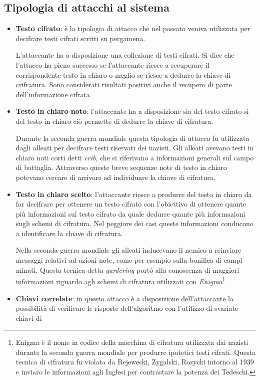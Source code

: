 \documentclass[11pt, a4paper, oneside]{Thesis} %
\begin{document}
\subsection{Tipologia di attacchi al sistema}
\begin{itemize}
 \item \textbf{Testo cifrato}: è la tipologia di attacco che nel passato veniva utilizzata per decifrare testi cifrati scritti su pergamena. 
 \par L'attaccante ha a disposizione una collezione di testi cifrati. Si dice che l'attacco ha pieno successo se l'attaccante riesce a 
 recuperare il corrispondente testo in chiaro o meglio se riesce a dedurre la chiave di crifratura. Sono considerati risultati positivi anche il recupero di parte dell'informazione
 cifrata.
 \item \textbf{Testo in chiaro noto}: l'attaccante ha a disposizione sia del testo cifrato si del testo in chiaro ciò permette di dedurre la chiave di cifratura. 
 \par Durante la seconda guerra mondiale questa tipologia di attacco fu utilizzata dagli alleati per decifrare testi riservati dei nazisti. Gli alleati avevano testi in chiaro noti
 corti detti \textit{crib}, che si riferivano a informazioni generali sul campo di battaglia. Attraverso queste breve sequenze note di testo in chiaro potevano cercare di arrivare 
 ad individuare la chiave di cifratura.
 \item \textbf{Testo in chiaro scelto}: l'attaccante riesce a produrre del testo in chiaro da far decifrare per ottenere un testo cifrato con l'obiettivo di ottenere quante più
 informazioni sul testo cifrato da quale dedurre quante più informazioni sugli schemi di cifratura. Nel peggiore dei casi queste informazioni conducono a identificare la chiave di 
 cifratura.
 \par Nella seconda guerra mondiale gli alleati inducevano il nemico a reinviare messaggi relativi ad azioni note, come per esempio sulla bonifica di campi minati. Questa tecnica 
 detta \textit{gardering} portò alla conoscenza di maggiori informazioni riguardo agli schemi di cifratura utilizzati con \textit{Enigma}\footnote{Enigma è il nome in codice della macchina
 di cifratura utilizzata dai nazisti durante la seconda guerra mondiale per produrre ipotetici testi cifrati. Questa tecnica di cifratura fu violata da Rejeweski, Zygalski, Rozycki 
 intorno al 1939 e inviaro le informazioni agli Inglesi per contrastare la potenza dei Tedeschi.}
 \item \textbf{Chiavi correlate}: in questo attacco è a disposizione dell'attaccante la possibilità di verificare le risposte dell'algoritmo con l'utilizzo di svariate chiavi di 

\end{itemize}
\end{document}
